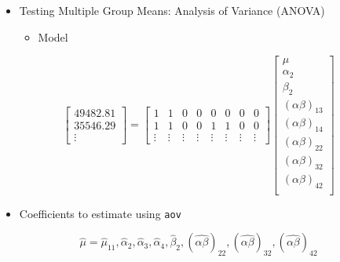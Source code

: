 \documentclass[
  ignorenonframetext,
]{beamer}
\providecommand{\tightlist}{%
  \setlength{\itemsep}{0pt}\setlength{\parskip}{0pt}}\usepackage{longtable,booktabs,array}
\begin{document}
\begin{frame}[fragile]{}
\label{section-35}
\begin{itemize}
\item
  Testing Multiple Group Means: Analysis of Variance (ANOVA)

  \begin{itemize}
  \tightlist
  \item
    Model
  \end{itemize}
\end{itemize}

\footnotesize

\[\begin{bmatrix}
  49482.81 \\
  35546.29 \\
  \vdots
  \end{bmatrix} =
  \begin{bmatrix}
  1 & 1 & 0 & 0 & 0 & 0 & 0 & 0 \\
  1 & 1 & 0 & 0 & 1 & 1 & 0 & 0 \\
  \vdots & \vdots & \vdots & \vdots & \vdots & \vdots & \vdots & \vdots
  \end{bmatrix} 
  \begin{bmatrix}
  \mu \\
  \alpha_2 \\
  \beta_2 \\
  (\alpha\beta)_{13} \\
  (\alpha\beta)_{14} \\
  (\alpha\beta)_{22} \\
  (\alpha\beta)_{32} \\
  (\alpha\beta)_{42} \\
  \end{bmatrix}\]

\normalsize

\begin{itemize}
\tightlist
\item
  Coefficients to estimate using \texttt{aov}
\end{itemize}

\footnotesize

\[\widehat{\mu} = \widehat{\mu}_{11}, \widehat{\alpha}_2, \widehat{\alpha}_3, \widehat{\alpha}_4, \widehat{\beta}_2, (\widehat{\alpha\beta})_{22}, (\widehat{\alpha\beta})_{32}, (\widehat{\alpha\beta})_{42}\]
\end{frame}
\end{document}
